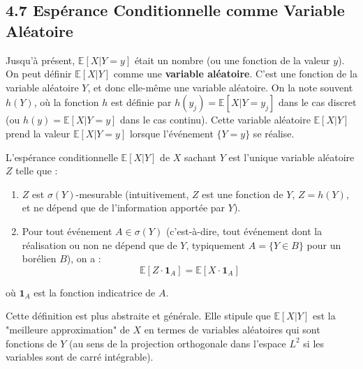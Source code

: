 \subsection*{4.7 \quad Espérance Conditionnelle comme Variable Aléatoire}

Jusqu'à présent, $\mathbb{E}[X|Y=y]$ était un nombre (ou une fonction de la valeur $y$). On peut définir $\mathbb{E}[X|Y]$ comme une \textbf{variable aléatoire}. C'est une fonction de la variable aléatoire $Y$, et donc elle-même une variable aléatoire. On la note souvent $h(Y)$, où la fonction $h$ est définie par $h(y_j) = \mathbb{E}[X|Y=y_j]$ dans le cas discret (ou $h(y) = \mathbb{E}[X|Y=y]$ dans le cas continu). Cette variable aléatoire $\mathbb{E}[X|Y]$ prend la valeur $\mathbb{E}[X|Y=y]$ lorsque l'événement $\{Y=y\}$ se réalise.

\vspace{1em}

\begin{definition}  L'espérance conditionnelle $\mathbb{E}[X|Y]$ de $X$ sachant $Y$ est l'unique variable aléatoire $Z$ telle que :

\begin{enumerate}
    \item $Z$ est $\sigma(Y)$-mesurable (intuitivement, $Z$ est une fonction de $Y$, $Z = h(Y)$, et ne dépend que de l'information apportée par $Y$).
    \item Pour tout événement $A \in \sigma(Y)$ (c'est-à-dire, tout événement dont la réalisation ou non ne dépend que de $Y$, typiquement $A = \{Y \in B\}$ pour un borélien $B$), on a :
    $$\mathbb{E}[Z \cdot \mathbf{1}_A] = \mathbb{E}[X \cdot \mathbf{1}_A]$$
\end{enumerate}

\noindent où $\mathbf{1}_A$ est la fonction indicatrice de $A$.
\end{definition}
\vspace{1em}

Cette définition est plus abstraite et générale. Elle stipule que $\mathbb{E}[X|Y]$ est la "meilleure approximation" de $X$ en termes de variables aléatoires qui sont fonctions de $Y$ (au sens de la projection orthogonale dans l'espace $L^2$ si les variables sont de carré intégrable).

